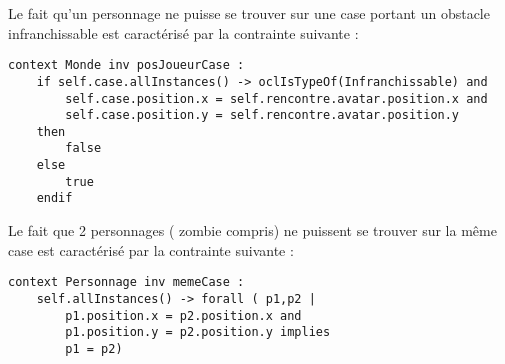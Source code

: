 Le fait qu'un personnage ne puisse se trouver sur une case portant un obstacle infranchissable est caractérisé par la contrainte suivante :

\begin{lstlisting}[caption=Contrainte sur la position du joueur sur case infranchissable,captionpos=b,label={lst:caseInfranchissable},language=OCL]
context Monde inv posJoueurCase :
	if self.case.allInstances() -> oclIsTypeOf(Infranchissable) and
		self.case.position.x = self.rencontre.avatar.position.x and
		self.case.position.y = self.rencontre.avatar.position.y
	then
		false
	else
		true
	endif
\end{lstlisting}

Le fait que 2 personnages ( zombie compris) ne puissent se trouver sur la même case est caractérisé par la contrainte suivante :

\begin{lstlisting}[caption=Contrainte sur la position de deux personnages,captionpos=b,label={lst:posPersonnages},language=OCL]
context Personnage inv memeCase :
	self.allInstances() -> forall ( p1,p2 |
		p1.position.x = p2.position.x and 
		p1.position.y = p2.position.y implies
		p1 = p2)
\end{lstlisting}
